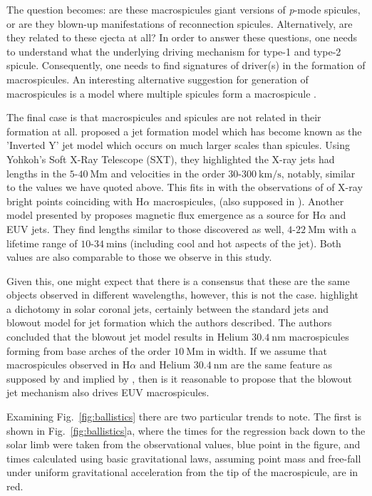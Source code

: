 The question becomes: are these macrospicules giant versions of \emph{p}-mode spicules, or are they blown-up manifestations of reconnection spicules. Alternatively, are they related to these ejecta at all? In order to answer these questions, one needs to understand what the underlying driving mechanism for type-1 and type-2 spicule. Consequently, one needs to find signatures of driver(s) in the formation of macrospicules. An interesting alternative suggestion for generation of macrospicules is a model where multiple spicules form a macrospicule \cite{Xia2005}.

The final case is that macrospicules and spicules are not related in their formation at all. \cite{Shibata1992} proposed a jet formation model which has become known as the 'Inverted Y' jet model which occurs on much larger scales than spicules. Using Yohkoh's Soft X-Ray Telescope (SXT), they highlighted the X-ray jets had lengths in the $5$-$40\ \textrm{Mm}$ and velocities in the order $30$-$300\ \textrm{km/s}$, notably, similar to the values we have quoted above. This fits in with the observations of \cite{Moore1977} of X-ray bright points coinciding with H$\alpha$ macrospicules, (also supposed in \cite{Kamio2010}). Another model presented by \cite{Jiang2007} proposes magnetic flux emergence as a source for H$\alpha$ and EUV jets. They find lengths similar to those discovered as well, $4$-$22\ \textrm{Mm}$ with a lifetime range of $10$-$34\ \textrm{mins}$ (including cool and hot aspects of the jet). Both values are also comparable to those we observe in this study.

Given this, one might expect that there is a consensus that these are the same objects observed in different wavelengths, however, this is not the case. \cite{Moore2010} highlight a dichotomy in solar coronal jets, certainly between the standard jets \cite{Shibata1992} and blowout model for jet formation which the authors described. The authors concluded that the blowout jet model results in Helium $30.4\ \textrm{nm}$ macrospicules forming from base arches of the order $10\ \textrm{Mm}$ in width. If we assume that macrospicules observed in H$\alpha$ and Helium $30.4\ \textrm{nm}$ are the same feature as supposed by \cite{LaBonte79} and implied by \cite{Parenti2002}, then is it reasonable to propose that the blowout jet mechanism also drives EUV macrospicules.

Examining Fig.~\ref{fig:ballistics} there are two particular trends to note. The first is shown in Fig.~\ref{fig:ballistics}a, where the times for the regression back down to the solar limb were taken from the observational values, blue point in the figure, and times calculated using basic gravitational laws, assuming point mass and free-fall under uniform gravitational acceleration from the tip of the macrospicule, are in red. 

